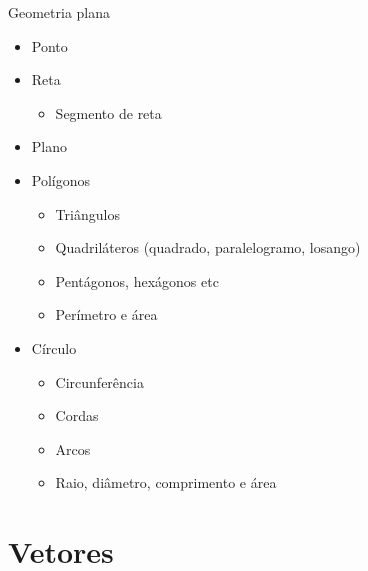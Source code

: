 \begin{frame}{Geometria plana}
    \begin{itemize}
        \item Ponto
        \item Reta
            \begin{itemize}
                \item Segmento de reta
            \end{itemize}
        \item Plano
        \item Polígonos
            \begin{itemize}
                \item Triângulos
                \item Quadriláteros (quadrado, paralelogramo, losango)
                \item Pentágonos, hexágonos etc
                \item<2> Perímetro e área
            \end{itemize}
        \item Círculo
            \begin{itemize}
                \item Circunferência
                \item Cordas
                \item Arcos
                \item<2> Raio, diâmetro, comprimento e área
            \end{itemize}
    \end{itemize}
\end{frame}

\section{Vetores}

